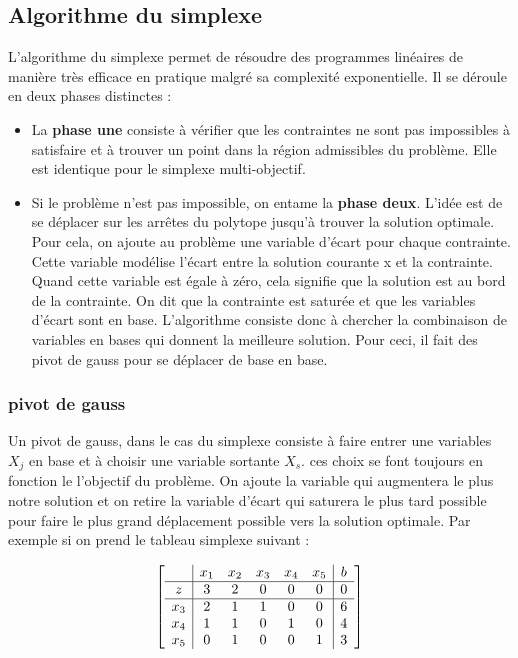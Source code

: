 \documentclass[a4paper,10pt]{article}
\newcommand{\mehdi}[1]{\textcolor{white}{#1}}
\theoremstyle{plain}
\begin{document}
\subsection{Algorithme du simplexe}
L'algorithme du simplexe permet de résoudre des programmes linéaires de manière très efficace en pratique malgré sa complexité exponentielle. Il se déroule en deux phases distinctes :
\begin{itemize}
\item La \textbf{phase une} consiste à vérifier que les contraintes ne sont pas impossibles à satisfaire et à trouver un point dans la région admissibles du problème. Elle est identique pour le simplexe multi-objectif.
\item Si le problème n'est pas impossible, on entame la \textbf{phase deux}. L'idée est de se déplacer sur les arrêtes du polytope jusqu'à trouver la solution optimale. Pour cela, on ajoute au problème une variable d'écart pour chaque contrainte. Cette variable modélise l'écart entre la solution courante x et la contrainte. Quand cette variable est égale à zéro, cela signifie que la solution est au bord de la contrainte. On dit que la contrainte est saturée et que les variables d'écart sont en base. L'algorithme consiste donc à chercher la combinaison de variables en bases qui donnent la meilleure solution. Pour ceci, il fait des pivot de gauss pour se déplacer de base en base.
\end{itemize}

\subsubsection{pivot de gauss}
Un pivot de gauss, dans le cas du simplexe consiste à faire entrer une variables $X_j$ en base et à choisir une variable sortante $X_s$. ces choix se font toujours en fonction le l'objectif du problème. On ajoute la variable qui augmentera le plus notre solution et on retire la variable d'écart qui saturera le plus tard possible pour faire le plus grand déplacement possible vers la solution optimale.
Par exemple si on prend le tableau simplexe suivant :

\begin{equation}
  \begin{bmatrix}
    \begin{array}{c|ccccc|c}
      \mehdi{.} & x_1 & x_2 & x_3 & x_4 & x_5 & b \\ \hline
      z  & 3 & 2 & 0 & 0 & 0 & 0 \\ \hline
      x_3 & 2 & 1 & 1 & 0 & 0 & 6 \\
      x_4 & 1 & 1 & 0 & 1 & 0 & 4 \\
      x_5 & 0 & 1 & 0 & 0 & 1 & 3 \\
    \end{array}
  \end{bmatrix}
\end{equation}
\end{document}
